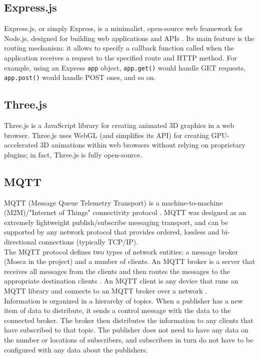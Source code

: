\subsection{Express.js}
Express.js, or simply Express, is a minimalist, open-source web framework for Node.js, designed for building web applications and APIs \cite{Express.js}. Its main feature is the routing mechanism: it allows to specify a callback function called when the application receives a request to the specified route and HTTP method. For example, using an Express \texttt{app} object, \texttt{app.get()} would handle GET requests, \texttt{app.post()} would handle POST ones, and so on.

\subsection{Three.js}
Three.js is a JavaScript library for creating animated 3D graphics in a web browser. Three.js uses WebGL (and simplifies its API) for creating GPU-accelerated 3D animations within web browsers without relying on proprietary plugins; in fact, Three.js is fully open-source.

\subsection{MQTT}
MQTT (Message Queue Telemetry Transport) is a machine-to-machine (M2M)/"Internet of Things" connectivity protocol \cite{MQTT}. MQTT was designed as an extremely lightweight publish/subscribe messaging transport, and can be supported by any network protocol that provides ordered, lossless and bi-directional connections \cite{MQTTDoc} (typically TCP/IP).\\
The MQTT protocol defines two types of network entities: a message broker (Mosca in the project) and a number of clients. An MQTT broker is a server that receives all messages from the clients and then routes the messages to the appropriate destination clients \cite{KnowMQTT}. An MQTT client is any device that runs an MQTT library and connects to an MQTT broker over a network \cite{ClientBroker}.\\
Information is organized in a hierarchy of topics. When a publisher has a new item of data to distribute, it sends a control message with the data to the connected broker. The broker then distributes the information to any clients that have subscribed to that topic. The publisher does not need to have any data on the number or locations of subscribers, and subscribers in turn do not have to be configured with any data about the publishers.


